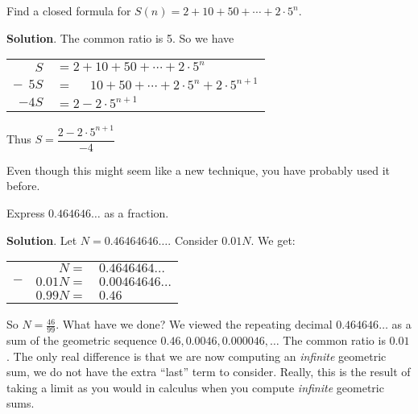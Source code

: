\documentclass[11pt,]{book}
\theoremstyle{ptxplainnotitle}
\theoremstyle{ptxplaintitle}
\theoremstyle{ptxdefinitionnotitle}
\theoremstyle{ptxdefinitiontitle}
\theoremstyle{ptxdefinitionnotitle}
\theoremstyle{ptxdefinitiontitle}
\theoremstyle{ptxdefinitionnotitle}
\theoremstyle{ptxdefinitiontitle}
\theoremstyle{ptxdefinitiontitlenonumber}
\theoremstyle{ptxdefinitiontitlenonumber}
\numberwithin{equation}{chapter}
\newcommand{\hrulethin}  {\noalign{\hrule height 0.04em}}
\begin{document}
\begin{example}\label{example-11}
\hypertarget{p-204}{}%
Find a closed formula for \(S(n) = 2 + 10 + 50 + \cdots + 2\cdot 5^n\).%
\par\smallskip%
\noindent\textbf{Solution}.\hypertarget{solution-17}{}\quad%
\hypertarget{p-205}{}%
The common ratio is 5. So we have%
\begin{sidebyside}{1}{0}{0}{0}
\begin{sbspanel}{1}
{\centering%
\begin{tabular}{rl}
\(S\)&\(= 2 + 10 + 50 + \cdots + 2\cdot 5^n\)\tabularnewline[0pt]
\(-~~5S\)&\(= ~~~~~~10 + 50 + \cdots + 2\cdot 5^n + 2\cdot5^{n+1}\)\tabularnewline\hrulethin
\(-4S\)&\(= 2  - 2\cdot5^{n+1}\)
\end{tabular}
\par}
\end{sbspanel}
\end{sidebyside}
\par
\hypertarget{p-206}{}%
Thus \(S = \dfrac{2-2\cdot 5^{n+1}}{-4}\)%
\end{example}
\hypertarget{p-207}{}%
Even though this might seem like a new technique, you have probably used it before.%
\begin{example}\label{example-12}
\hypertarget{p-208}{}%
Express \(0.464646\ldots\) as a fraction.%
\par\smallskip%
\noindent\textbf{Solution}.\hypertarget{solution-18}{}\quad%
\hypertarget{p-209}{}%
Let \(N = 0.46464646\ldots\). Consider \(0.01N\). We get:%
\begin{sidebyside}{1}{0}{0}{0}
\begin{sbspanel}{1}
{\centering%
\begin{tabular}{lrl}
&\(N =\)&\(0.4646464\ldots\)\tabularnewline[0pt]
\(-\)&\(0.01N =\)&\(0.00464646\ldots\)\tabularnewline\hrulethin
&\(0.99N =\)&\(0.46\)
\end{tabular}
\par}
\end{sbspanel}
\end{sidebyside}
\par
\hypertarget{p-210}{}%
So \(N = \frac{46}{99}\). What have we done? We viewed the repeating decimal \(0.464646\ldots\) as a sum of the geometric sequence \(0.46, 0.0046, 0.000046, \ldots\) The common ratio is \(0.01\). The only real difference is that we are now computing an \emph{infinite} geometric sum, we do not have the extra ``last'' term to consider. Really, this is the result of taking a limit as you would in calculus when you compute \emph{infinite} geometric sums.%
\end{example}
\typeout{************************************************}
\typeout{************************************************}
\end{document}
